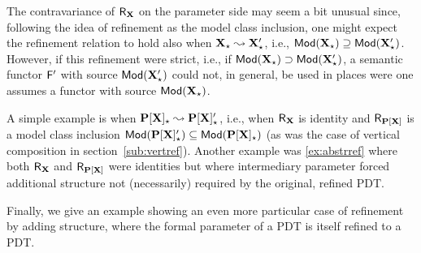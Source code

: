 The contravariance of ${\sf {R}}_{{\bf X}}$ on the parameter side may seem a bit unusual since,
following the idea of refinement as the model class inclusion, one might
expect the refinement relation to hold also when
${\bf X_\star}\leadsto{\bf X'_\star}$, i.e., ${\sf {Mod}}({\bf X}_\star)\supseteq{\sf {Mod}}({\bf X}'_\star)$. However, if this refinement were
strict, i.e., if ${\sf {Mod}}({\bf X}_\star)\supset{\sf {Mod}}({\bf X}'_\star)$, 
a semantic functor ${\sf {F}}'$ with source ${\sf {Mod}}({\bf X'_\star})$ could not, in
general, be used in places were one assumes a functor with source ${\sf {Mod}}({\bf X_\star})$.

A simple example is when ${\bf P[X]_\star}\leadsto{\bf P[X]'_\star}$, i.e., when
${\sf {R}}_{{\bf X}}$ is identity and
${\sf {R}}_{{\bf P[X]}}$ is a model class inclusion ${\sf {Mod}}({\bf P[X]'_\star})\subseteq
{\sf {Mod}}({\bf P[X]_\star})$ (as was the case of vertical composition in section~\ref{sub:vertref}). 
Another example was \ref{ex:abstrref} %
where both ${\sf {R}}_{{\bf X}}$ and ${\sf {R}}_{{\bf P[X]}}$ were
identities but where intermediary parameter forced additional structure
not (necessarily) required by the original, refined PDT.

Finally, we give an example showing an even more particular case of
refinement by adding structure, where the formal parameter of a PDT is itself
refined to a PDT.

